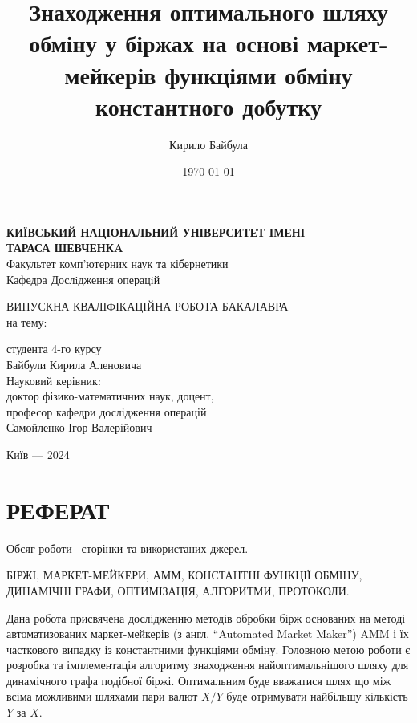 \documentclass[14pt]{extarticle}
\author{Кирило Байбула}
\date{\today}
\title{Знаходження оптимального шляху обміну у біржах на основі маркет-мейкерів функціями обміну константного добутку}
\begin{document}
\begin{titlepage}
	\begin{center}
		\vspace*{1cm}

		\textbf{КИЇВСЬКИЙ НАЦІОНАЛЬНИЙ УНІВЕРСИТЕТ ІМЕНІ \\ ТАРАСА ШЕВЧЕНКA} \\
		Факультет комп'ютерних наук та кібернетики \\
		Кафедра Дослiдження операцiй

		\vspace{2.0cm}
		ВИПУСКНА КВАЛІФІКАЦІЙНА РОБОТА БАКАЛАВРА \\
		на тему: \\
		\textbf{\THETITLE}
		\vspace{1.5cm}
		\begin{flushright}
			студента 4-го курсу \\
			Байбули Кирила Аленовича \\
			\vspace{2.0cm}
			Науковий керівник: \\
			доктор фізико-математичних наук, доцент, \\
			професор кафедри дослідження операцій \\
			Самойленко Ігор Валерійович
		\end{flushright}

		\vfill

		\vspace{0.8cm}
		Київ ---  2024
	\end{center}
\end{titlepage}
\newpage


\section*{РЕФЕРАТ}\label{sec:abstract}

Обсяг роботи~\ztotpages{} сторінки та  використаних джерел.

БІРЖІ, МАРКЕТ-МЕЙКЕРИ, АММ, КОНСТАНТНІ ФУНКЦІЇ ОБМІНУ, ДИНАМІЧНІ ГРАФИ,
ОПТИМІЗАЦІЯ, АЛГОРИТМИ, ПРОТОКОЛИ.

Дана робота присвячена дослідженню методів обробки бірж основаних на методі
автоматизованих маркет-мейкерів (з англ. ``Automated Market Maker'') AMM і їх
часткового випадку із константними функціями обміну. Головною метою роботи є
розробка та імплементація алгоритму знаходження найоптимальнішого шляху для
динамічного графа подібної біржі. Оптимальним буде вважатися шлях що між всіма
можливими шляхами пари валют $X/Y$ буде отримувати найбільшу кількість $Y$ за
$X$.
\end{document}
